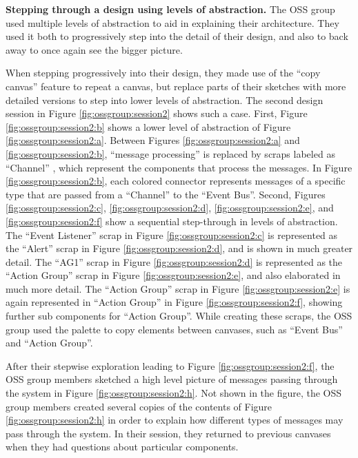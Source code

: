 \textbf{Stepping through a design using levels of abstraction. } The OSS group used multiple levels of abstraction to aid in explaining their architecture. They used it both to progressively step into the detail of their design, and also to back away to once again see the bigger picture.

When stepping progressively into their design, they made use of the ``copy canvas'' feature to repeat a canvas, but replace parts of their sketches with more detailed versions to step into lower levels of abstraction. The second design session in Figure \ref{fig:ossgroup:session2} shows such a case. First, Figure \ref{fig:ossgroup:session2:b} shows a lower level of abstraction of Figure \ref{fig:ossgroup:session2:a}. Between Figures \ref{fig:ossgroup:session2:a} and \ref{fig:ossgroup:session2:b}, ``message processing'' is replaced by scraps labeled as ``Channel'' , which represent the components that process the messages.  In Figure \ref{fig:ossgroup:session2:b}, each colored connector represents messages of a specific type that are passed from a ``Channel'' to the ``Event Bus''. Second,  Figures \ref{fig:ossgroup:session2:c}, \ref{fig:ossgroup:session2:d}, \ref{fig:ossgroup:session2:e}, and \ref{fig:ossgroup:session2:f} show a sequential step-through in levels of abstraction. The ``Event Listener'' scrap in Figure \ref{fig:ossgroup:session2:c} is represented as the ``Alert'' scrap in Figure \ref{fig:ossgroup:session2:d}, and is shown in much greater detail. The ``AG1'' scrap in Figure \ref{fig:ossgroup:session2:d} is represented as the ``Action Group'' scrap in Figure \ref{fig:ossgroup:session2:e}, and also elaborated in much more detail. The ``Action Group'' scrap in Figure \ref{fig:ossgroup:session2:e} is again represented in ``Action Group'' in Figure \ref{fig:ossgroup:session2:f}, showing further sub components for ``Action Group''. While creating these scraps, the OSS group used the palette to copy elements between canvases, such as ``Event Bus'' and ``Action Group''.

After their stepwise exploration leading to Figure \ref{fig:ossgroup:session2:f}, the OSS group members sketched a high level picture of messages passing through the system in Figure \ref{fig:ossgroup:session2:h}. Not shown in the figure, the OSS group members created several copies of the contents of Figure \ref{fig:ossgroup:session2:h} in order to explain how different types of messages may pass through the system. In their session, they returned to previous canvases when they had questions about particular components.

